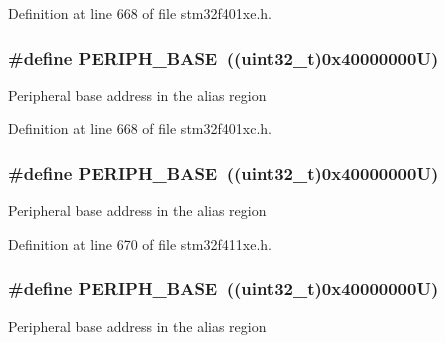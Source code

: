 Definition at line 668 of file stm32f401xe.\+h.

\subsubsection[{\texorpdfstring{P\+E\+R\+I\+P\+H\+\_\+\+B\+A\+SE}{PERIPH_BASE}}]{\setlength{\rightskip}{0pt plus 5cm}\#define P\+E\+R\+I\+P\+H\+\_\+\+B\+A\+SE~((uint32\+\_\+t)0x40000000\+U)}\hypertarget{group___peripheral__registers__structures_ga9171f49478fa86d932f89e78e73b88b0}{}\label{group___peripheral__registers__structures_ga9171f49478fa86d932f89e78e73b88b0}
Peripheral base address in the alias region 

Definition at line 668 of file stm32f401xc.\+h.

\subsubsection[{\texorpdfstring{P\+E\+R\+I\+P\+H\+\_\+\+B\+A\+SE}{PERIPH_BASE}}]{\setlength{\rightskip}{0pt plus 5cm}\#define P\+E\+R\+I\+P\+H\+\_\+\+B\+A\+SE~((uint32\+\_\+t)0x40000000\+U)}\hypertarget{group___peripheral__registers__structures_ga9171f49478fa86d932f89e78e73b88b0}{}\label{group___peripheral__registers__structures_ga9171f49478fa86d932f89e78e73b88b0}
Peripheral base address in the alias region 

Definition at line 670 of file stm32f411xe.\+h.

\subsubsection[{\texorpdfstring{P\+E\+R\+I\+P\+H\+\_\+\+B\+A\+SE}{PERIPH_BASE}}]{\setlength{\rightskip}{0pt plus 5cm}\#define P\+E\+R\+I\+P\+H\+\_\+\+B\+A\+SE~((uint32\+\_\+t)0x40000000\+U)}\hypertarget{group___peripheral__registers__structures_ga9171f49478fa86d932f89e78e73b88b0}{}\label{group___peripheral__registers__structures_ga9171f49478fa86d932f89e78e73b88b0}
Peripheral base address in the alias region 

